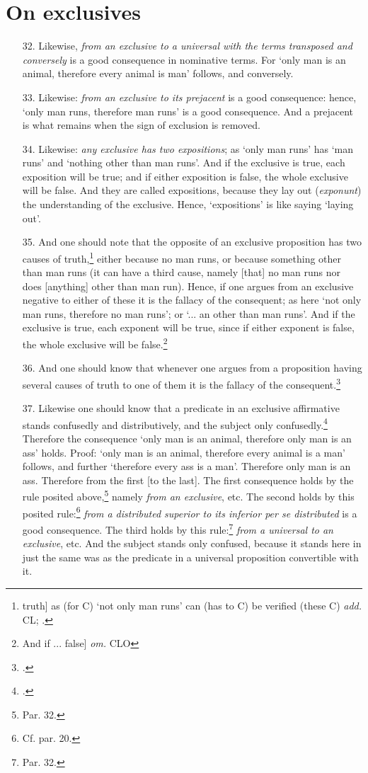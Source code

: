 \section{On exclusives}
\begin{itemize}
\item[32.] Likewise, \textit{from an exclusive to a universal with the terms transposed and conversely} is a good consequence in nominative terms. For `only man is an animal, therefore every animal is man' follows, and conversely.
\item[33.] Likewise: \textit{from an exclusive to its prejacent} is a good consequence: hence, `only man runs, therefore man runs' is a good consequence. And a prejacent is what remains when the sign of exclusion is removed.
\item[34.] Likewise: \textit{any exclusive has two expositions}; as `only man runs' has `man runs' and `nothing other than man runs'. And if the exclusive is true, each exposition will be true; and if either exposition is false, the whole exclusive will be false. And they are called expositions, because they lay out (\textit{exponunt}) the understanding of the exclusive. Hence, `expositions' is like saying `laying out'.
\item[35.] And one should note that the opposite of an exclusive proposition has two causes of truth,\footnote{truth] as (for C) `not only man runs' can (has to C) be verified (these C) \textit{add.} CL; \cite[p. 135.35]{BurleyDPAL}.} either because no man runs, or because something other than man runs (it can have a third cause, namely [that] no man runs nor does [anything] other than man run). Hence, if one argues from an exclusive negative to either of these it is the fallacy of the consequent; as here `not only man runs, therefore no man runs'; or `... an other than man runs'. And if the exclusive is true, each exponent will be true, since if either exponent is false, the whole exclusive will be false.\footnote{And if ... false] \textit{om.} CLO}
\item[36.] And one should know that whenever one argues from a proposition having several causes of truth to one of them it is the fallacy of the consequent.\footnote{\cite[p. 212.29]{BurleyDPAL}.}
\item[37.] Likewise one should know that a predicate in an exclusive affirmative stands confusedly and distributively, and the subject only confusedly.\footnote{\cite[p. 133.27]{BurleyDPAL}.} Therefore the consequence `only man is an animal, therefore only man is an ass' holds. Proof: `only man is an animal, therefore every animal is a man' follows, and further `therefore every ass is a man'. Therefore only man is an ass.  Therefore from the first [to the last]. The first consequence holds by the rule posited above,\footnote{Par. 32.} namely \textit{from an exclusive}, etc. The second holds by this posited rule:\footnote{Cf. par. 20.} \textit{from a distributed superior to its inferior per se distributed} is a good consequence. The third holds by this rule:\footnote{Par. 32.} \textit{from a universal to an exclusive}, etc. And the subject stands only confused, because it stands here in just the same was as the predicate in a universal proposition convertible with it.

\end{itemize}

